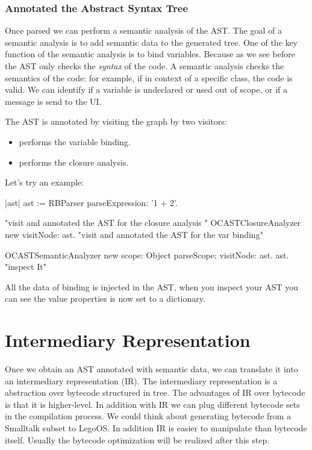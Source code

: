 \documentclass[a4paper,10pt,twoside]{book}
\begin{document}
\subsubsection{Annotated the Abstract Syntax Tree}

Once parsed we can perform a semantic analysis of the AST. The goal of a semantic analysis is to add semantic data to the generated tree. One of the key function of the semantic analysis is to bind variables. 
Because as we see before the AST only checks the \emph{syntax} of the code. A semantic analysis  checks the semantics of the code: for example, if in context of a specific class, the code is valid. We can identify if a variable is undeclared or used out of scope, or if a message is send to the UI. 

The AST is annotated by visiting the graph by two visitors:
\begin{itemize}
\item {} performs the variable binding.
\item {} performs the closure analysis.
\end{itemize}

Let's try an example:

\begin{code}{}
|ast|
ast := RBParser parseExpression: '1 + 2'.

"visit and annotated the AST for the closure analysis "
OCASTClosureAnalyzer new visitNode: ast.
"visit and annotated the AST for the var binding"

OCASTSemanticAnalyzer new
		scope: Object parseScope;
		visitNode: ast.
ast. "inspect It"
\end{code}


All the data of binding is injected in the AST, when you inspect your AST you can see the value properties is now 
set to a dictionary. 





\section{Intermediary Representation}
Once we obtain an AST annotated with semantic data, we can translate it into an intermediary representation (IR). The intermediary representation is a abstraction over bytecode structured in tree. The advantages of IR over bytecode is that it is higher-level. In addition with IR we can plug different bytecode sets in the compilation process. We could think about generating bytecode from a Smalltalk subset to LegoOS. In addition IR is easier to manipulate  than bytecode itself.
 Usually the bytecode optimization will be realized after this step.
 
\end{document}
